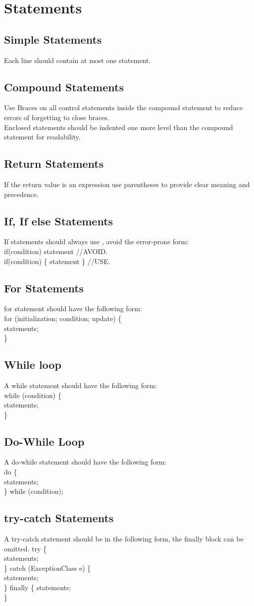 \documentclass[a4paper,12pt]{report}
\begin{document}
\section{Statements}
\subsection{Simple Statements}
Each line should contain at most one statement.
\subsection{Compound Statements}
Use Braces on all control statements inside the compound statement to reduce errors of forgetting to close braces.\\
Enclosed statements should be indented one more level than the compound statement for readability.  
\subsection{Return Statements}
If the return value is an expression use parentheses to provide clear meaning and precedence.
\subsection{If, If else Statements}
If statements should always use {}, avoid the error-prone form:\\ if(condition) statement //AVOID.\\
if(condition) \{ statement \} //USE. 
\subsection{For Statements}
for statement should have the following form:\\
for (initialization; condition; update) \{ \\
	\indent statements;\\
\} 
\subsection{While loop}
A while statement should have the following form:\\
while (condition) \{ \\
	\indent statements;\\
\}
\subsection{Do-While Loop}
A do-while statement should have the following form:\\
do \{ \\
	\indent statements; \\
\} while (condition); 
\subsection{try-catch Statements}
A try-catch statement should be in the following form, the finally block can be omitted. 
try \{ \\
	\indent statements;\\
\} catch (ExceptionClass e) \{ \\
	\indent statements;\\
\} finally \{
	\indent statements;\\
\}
\end{document}
